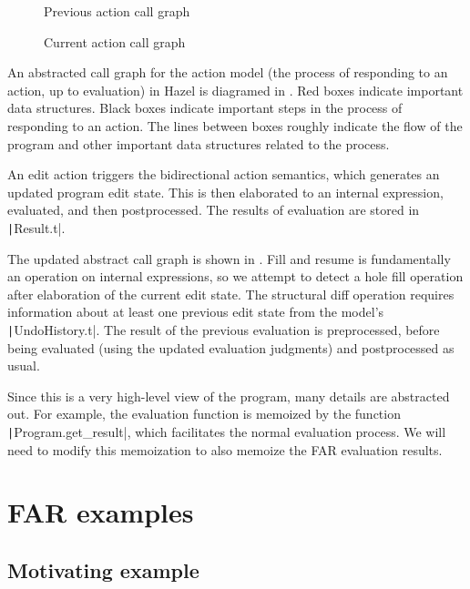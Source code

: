 \begin{figure}
  \centering
  
  \caption{Previous action call graph}
  \label{fig:prev-evaluation-call-graph}
\end{figure}

\begin{figure}
  \centering
  
  \caption{Current action call graph}
  \label{fig:current-evaluation-call-graph}
\end{figure}

An abstracted call graph for the action model (the process of responding to an action, up to evaluation) in Hazel is diagramed in . Red boxes indicate important data structures. Black boxes indicate important steps in the process of responding to an action. The lines between boxes roughly indicate the flow of the program and other important data structures related to the process.

An edit action triggers the bidirectional action semantics, which generates an updated program edit state. This is then elaborated to an internal expression, evaluated, and then postprocessed. The results of evaluation are stored in \texttt|Result.t|.

The updated abstract call graph is shown in . Fill and resume is fundamentally an operation on internal expressions, so we attempt to detect a hole fill operation after elaboration of the current edit state. The structural diff operation requires information about at least one previous edit state from the model's \texttt|UndoHistory.t|. The result of the previous evaluation is preprocessed, before being evaluated (using the updated evaluation judgments) and postprocessed as usual.

Since this is a very high-level view of the program, many details are abstracted out. For example, the evaluation function is memoized by the function \texttt|Program.get_result|, which facilitates the normal evaluation process. We will need to modify this memoization to also memoize the FAR evaluation results.

\section{FAR examples}
\label{sec:far-examples}

\subsection{Motivating example}
\label{sec:far-motivating-example}


